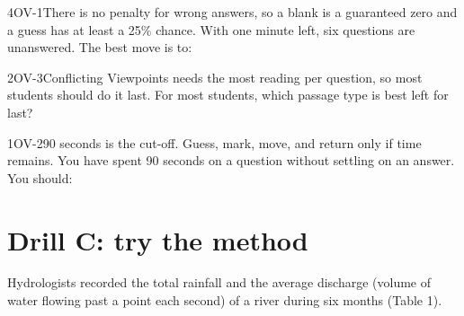 \documentclass[11pt]{article}
\begin{document}
\begin{q}{4}{OV-1}{There is no penalty for wrong answers, so a blank is a guaranteed zero and a guess has at least a 25\% chance.}
With one minute left, six questions are unanswered. The best move is to:
\end{q}

\begin{q}{2}{OV-3}{Conflicting Viewpoints needs the most reading per question, so most students should do it last.}
For most students, which passage type is best left for last?
\end{q}

\begin{q}{1}{OV-2}{90 seconds is the cut-off. Guess, mark, move, and return only if time remains.}
You have spent 90 seconds on a question without settling on an answer. You should:
\end{q}

\section{Drill C: try the method}


Hydrologists recorded the total rainfall and the average discharge (volume of water flowing past a point each second) of a river during six months (Table 1).

\passageend
\end{document}
